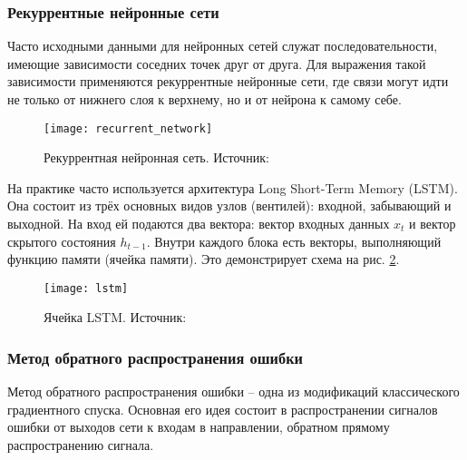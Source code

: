 \subsubsection{Рекуррентные нейронные сети}
Часто исходными данными для нейронных сетей служат последовательности, имеющие
зависимости соседних точек друг от друга. Для выражения такой зависимости
применяются рекуррентные нейронные сети, где связи могут идти не только от
нижнего слоя к верхнему, но и от нейрона к самому себе. 

\begin{figure}[h]
\centering
\texttt{[image: recurrent\_network]}
\caption{Рекуррентная нейронная сеть. Источник: \cite{deeplearning}}
\label{fig:recurrent_network}
\end{figure}

На практике часто используется архитектура Long Short-Term Memory (LSTM). Она
состоит из трёх основных видов узлов (вентилей): входной, забывающий и выходной.
На вход ей подаются два вектора: вектор входных данных $x_t$ и вектор скрытого
состояния $h_{t-1}$. Внутри каждого блока есть векторы, выполняющий функцию
памяти (ячейка памяти)\cite{deeplearning}. Это демонстрирует схема на рис. \ref{fig:lstm}.
\begin{figure}[h]
\centering
\texttt{[image: lstm]}
\caption{Ячейка LSTM. Источник: \cite{deeplearning}}
\label{fig:lstm}
\end{figure}

\subsubsection{Метод обратного распространения ошибки}
Метод обратного распространения ошибки -- одна из модификаций классического
градиентного спуска. Основная его идея состоит в распространении сигналов ошибки
от выходов сети к входам в направлении, обратном прямому распространению
сигнала. 